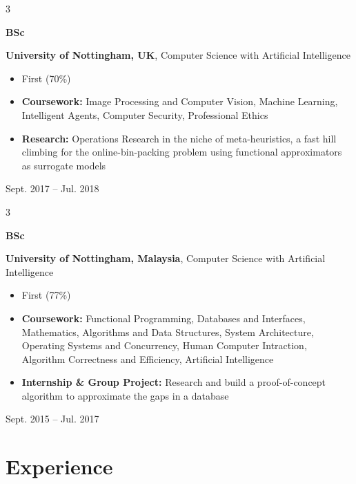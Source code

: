 \documentclass[10pt, letterpaper]{article}
\newenvironment{highlights}{
    \begin{itemize}[
        topsep=0.10 cm,
        parsep=0.10 cm,
        partopsep=0pt,
        itemsep=0pt,
        leftmargin=0.4 cm + 10pt
    ]
}{
    \end{itemize}
} %
\newenvironment{threecolentry}[3][]{
    \onecolentry
    \def\thirdColumn{#3}
    \setcolumnwidth{1 cm, \fill, 4.5 cm}
    \begin{paracol}{3}
    {\raggedright #2} \switchcolumn
}{
    \switchcolumn \raggedleft \thirdColumn
    \end{paracol}
    \endonecolentry
} %
\begin{document}
        \begin{threecolentry}{\textbf{BSc}}{
            Sept. 2017 – Jul. 2018
        }
            \textbf{University of Nottingham, UK}, Computer Science with Artificial Intelligence
            \begin{highlights}
                \item First (70\%)
                \item \textbf{Coursework:} Image Processing and Computer Vision, Machine Learning, Intelligent Agents, Computer Security, Professional Ethics
                \item \textbf{Research:} Operations Research in the niche of meta-heuristics, a fast hill climbing for the online-bin-packing problem using functional approximators as surrogate models 
            \end{highlights}
        \end{threecolentry}

        \begin{threecolentry}{\textbf{BSc}}{
            Sept. 2015 – Jul. 2017
        }
            \textbf{University of Nottingham, Malaysia}, Computer Science with Artificial Intelligence
            \begin{highlights}
                \item First (77\%)
                \item \textbf{Coursework:} Functional Programming, Databases and Interfaces, Mathematics, Algorithms and Data Structures, 
                    System Architecture, Operating Systems and Concurrency, Human Computer Intraction, 
                    Algorithm Correctness and Efficiency, Artificial Intelligence
                \item \textbf{Internship \& Group Project:} Research and build a proof-of-concept algorithm to approximate the gaps in a database
            \end{highlights}
        \end{threecolentry}

    
    \section{Experience}
\end{document}
